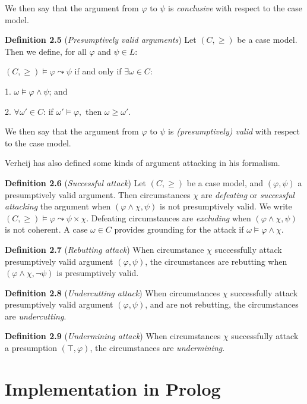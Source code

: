 \documentclass{IOS-Book-Article}
\begin{document}
We then say that the argument from $\varphi$ to $\psi$ is \textit{conclusive} with respect to the case model.

\textbf{Definition 2.5} (\textit{Presumptively valid arguments}) Let $(C,  \geq)$ be a case model. Then we define, for all $\varphi$ and $\psi \in L$:

$(C,  \geq) \vDash \varphi \leadsto \psi$ if and only if $\exists \omega \in C$:

1. $\omega \vDash \varphi \wedge \psi$; and

2. $\forall \omega' \in C$: if $\omega' \vDash \varphi, $ then $\omega \geq \omega'$.

We then say that the argument from $\varphi$ to $\psi$ is \textit{(presumptively) valid} with respect to the case model.

Verheij has also defined some kinds of argument attacking in his formalism\citep{Verheij2017Formalizing}.

\textbf{Definition 2.6} (\textit{Successful attack}) Let $(C,  \geq)$ be a case model, and $(\varphi, \psi)$ a presumptively valid argument. Then circumstances $\chi$ are \textit{defeating} or \textit{successful attacking} the argument when $(\varphi \wedge \chi, \psi)$ is not presumptively valid. We write $(C,  \geq) \vDash \varphi \leadsto \psi \times \chi$. Defeating circumstances are \textit{excluding} when $(\varphi \wedge \chi, \psi)$ is not coherent. A case $\omega \in C$ provides grounding for the attack if $\omega \vDash \varphi \wedge \chi$.

\textbf{Definition 2.7} (\textit{Rebutting attack}) When circumstance $\chi$ successfully attack presumptively valid argument $(\varphi, \psi)$, the circumstances are rebutting when $(\varphi \wedge \chi, \neg \psi)$ is presumptively valid.

\textbf{Definition 2.8} (\textit{Undercutting attack}) When circumstances $\chi$ successfully attack presumptively valid argument $(\varphi, \psi)$, and are not rebutting, the circumstances are \textit{undercutting}.

\textbf{Definition 2.9} (\textit{Undermining attack}) When circumstances $\chi$ successfully attack a presumption $(\top, \varphi)$, the circumstances are \textit{undermining}.

\section{Implementation in Prolog}

\end{document}
